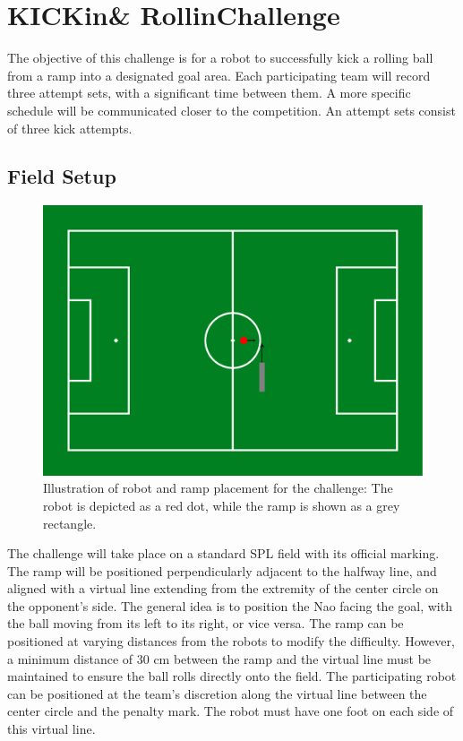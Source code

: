 \section{KICKin\textquotesingle \& Rollin\textquotesingle Challenge}

The objective of this challenge is for a robot to successfully kick a rolling ball from a ramp into a designated goal area. 
Each participating team will record three attempt sets, with a significant time between them.
A more specific schedule will be communicated closer to the competition.
An attempt sets consist of three kick attempts. 

\subsection{Field Setup}

\begin{figure}[t]
    \centerline{\includegraphics[width=\columnwidth]{figs/KICKin-Rollin-Challenge.pdf}}
    \caption{Illustration of robot and ramp placement for the challenge: The robot is depicted as a red dot, while the ramp is shown as a grey rectangle.}
    \label{fig:KICKin-Rolling-Challenge}
\end{figure}

The challenge will take place on a standard SPL field with its official marking. 
The ramp will be positioned perpendicularly adjacent to the halfway line, and aligned with a virtual line extending from the extremity of the center circle on the opponent's side.
The general idea is to position the Nao facing the goal, with the ball moving from its left to its right, or vice versa.
The ramp can be positioned at varying distances from the robots to modify the difficulty.
However, a minimum distance of 30 cm between the ramp and the virtual line must be maintained to ensure the ball rolls directly onto the field.
The participating robot can be positioned at the team’s discretion along the virtual line between the center circle and the penalty mark.
The robot must have one foot on each side of this virtual line.


